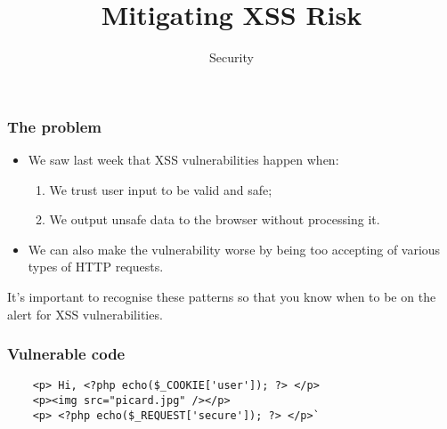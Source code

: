 \documentclass[10pt]{beamer}
\title{Mitigating XSS Risk}
\author[IN618]{Security}
\institute[Otago Polytechnic]{
  Otago Polytechnic \\
  Dunedin, New Zealand \\
}
\date{}
\begin{document}
\begin{frame}[plain]
  \titlepage
\end{frame}


\begin{frame}
	\frametitle{The problem}
	\begin{itemize}
		\item We saw last week that XSS vulnerabilities happen when:
			\begin{enumerate}
				\item We trust user input to be valid and safe;
				\item We output unsafe data to the browser without 
					processing it.
			\end{enumerate}
		\item We can also make the vulnerability worse by being too accepting
			of various types of HTTP requests.
	\end{itemize}

	It's important to recognise these patterns so that you know when to be 
	on the alert for XSS vulnerabilities.
\end{frame}

\begin{frame}[fragile]
	\frametitle{Vulnerable code}
	\begin{verbatim}
    <p> Hi, <?php echo($_COOKIE['user']); ?> </p> 
    <p><img src="picard.jpg" /></p>
    <p> <?php echo($_REQUEST['secure']); ?> </p>`
	\end{verbatim}
\end{frame}
\end{document}
